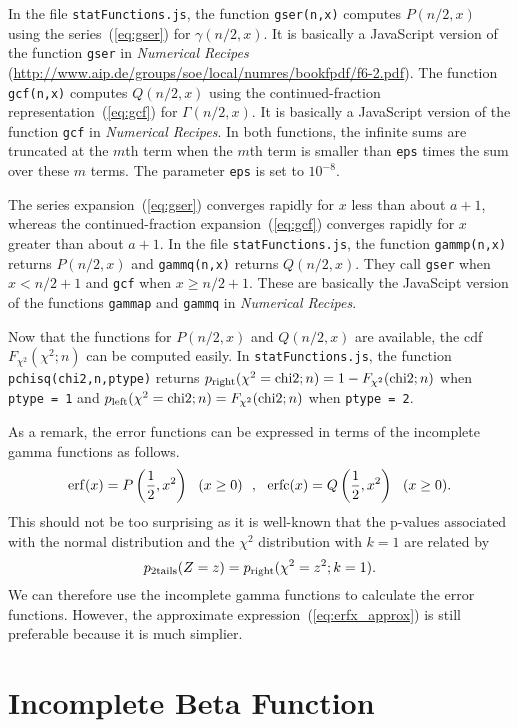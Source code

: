 \documentclass[12pt]{article}
\newcommand \beq {\begin{equation}}
\newcommand \eeq {\end{equation}}
\begin{document}
In the file {\tt statFunctions.js}, 
the function {\tt gser(n,x)} computes $P(n/2,x)$ using the 
series~(\ref{eq:gser}) for $\gamma(n/2,x)$. It is basically a JavaScript version of 
the function {\tt gser} in {\it Numerical Recipes} 
(\url{http://www.aip.de/groups/soe/local/numres/bookfpdf/f6-2.pdf}). The 
function {\tt gcf(n,x)} computes $Q(n/2,x)$ using the continued-fraction 
representation~(\ref{eq:gcf}) 
for $\Gamma(n/2,x)$. It is basically a JavaScript version of the function {\tt gcf} 
in {\it Numerical Recipes}. In both functions, the infinite sums are truncated at the 
$m$th term when the $m$th term is smaller than {\tt eps} times the sum over these 
$m$ terms. The parameter {\tt eps} is set to $10^{-8}$.

The series expansion~(\ref{eq:gser}) converges rapidly for $x$ less than about $a+1$, 
whereas the continued-fraction expansion~(\ref{eq:gcf}) converges rapidly for 
$x$ greater than about $a+1$. In the file {\tt statFunctions.js}, the function 
{\tt gammp(n,x)} returns $P(n/2,x)$ and {\tt gammq(n,x)} returns $Q(n/2,x)$. They 
call {\tt gser} when $x < n/2+1$ and {\tt gcf} when $x \geq n/2+1$. These are 
basically the JavaScipt version of the functions {\tt gammap} and {\tt gammq} 
in {\it Numerical Recipes}. 

Now that the functions for $P(n/2,x)$ and $Q(n/2,x)$ are available, the 
cdf $F_{\chi^2}(\chi^2; n)$ can be computed easily. In {\tt statFunctions.js}, the function 
{\tt pchisq(chi2,n,ptype)} returns $p_{\rm right}(\chi^2={\rm chi2};n)=1-F_{\chi^2}({\rm chi2};n)$ when {\tt ptype = 1} and 
$p_{\rm left}(\chi^2={\rm chi2};n)=F_{\chi^2}({\rm chi2};n)$ when {\tt ptype = 2}.

As a remark, the error functions can be expressed in terms of the incomplete 
gamma functions as follows.
\beq
  {\rm erf}(x) = P\left(\frac{1}{2}, x^2\right) \ \ (x \geq 0) \ \ , \ \ 
  {\rm erfc}(x) = Q\left( \frac{1}{2}, x^2\right) \ \ (x \geq 0) .
\eeq
This should not be too surprising as it is well-known that 
the p-values associated with the normal distribution and the $\chi^2$ distribution 
with $k=1$ are related by 
\beq
  p_{\rm 2tails}(Z=z) = p_{\rm right}(\chi^2=z^2;k=1) .
\label{eq:pNormal_pChi2}
\eeq
We can therefore use the incomplete gamma functions to calculate the error functions. 
However, the approximate expression~(\ref{eq:erfx_approx}) is still preferable 
because it is much simplier.

\section{Incomplete Beta Function}
\end{document}
